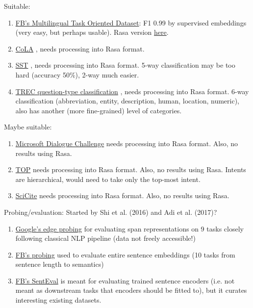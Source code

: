 \documentclass[bsc,frontabs,twoside,singlespacing,parskip,deptreport]{infthesis}
\begin{document}
{{    Suitable:
    \begin{enumerate}
      \item \href{https://fb.me/multilingual_task_oriented_data}{FB's Multilingual Task Oriented Dataset}: F1 0.99 by supervised embeddings (very easy, but perhaps usable). Rasa version \href{https://github.com/nghuyong/rasa-nlu-benchmark}{here}.
      \item \href{https://nyu-mll.github.io/CoLA/}{CoLA} \citep{CoLA-paper}, needs processing into Rasa format.
      \item \href{https://nlp.stanford.edu/sentiment/index.html}{SST} \citep{SST-paper}, needs processing into Rasa format. 5-way classification may be too hard (accuracy \texttildelow{}50\%), 2-way much easier.
      \item \href{https://cogcomp.seas.upenn.edu/Data/QA/QC/}{TREC question-type classification} \citep{TREC-paper}, needs processing into Rasa format. 6-way classification (abbreviation, entity, description, human, location, numeric), also has another (more fine-grained) level of categories.
    \end{enumerate}

    Maybe suitable:
    \begin{enumerate}
      \item \href{https://github.com/xiul-msr/e2e_dialog_challenge}{Microsoft Dialogue Challenge} \citep{MDC-paper} needs processing into Rasa format. Also, no results using Rasa.
      \item \href{http://fb.me/semanticparsingdialog}{TOP} \citep{TOP-paper} needs processing into Rasa format. Also, no results using Rasa. Intents are hierarchical, would need to take only the top-most intent.
      \item \href{https://github.com/allenai/scicite}{SciCite} \citep{SciCite-paper} needs processing into Rasa format. Also, no results using Rasa.
    \end{enumerate}

    Probing/evaluation:
    Started by Shi et al. (2016) and Adi et al. (2017)?
    \begin{enumerate}
      \item \href{https://github.com/nyu-mll/jiant/tree/master/probing/data}{Google's edge probing} \citep{Tenney-et-al-2019-1} for evaluating span representations on 9 tasks closely following classical NLP pipeline (data not freely accessible!)
      \item \href{https://github.com/facebookresearch/SentEval/tree/master/data/probing}{FB's probing} \citep{Conneau-et-al-2018} used to evaluate entire sentence embeddings (10 tasks from sentence length to semantics)
      \item \href{https://github.com/facebookresearch/SentEval}{FB's SentEval} \citep{SentEval-paper} is meant for evaluating trained sentence encoders (i.e. not meant as downstream tasks that encoders should be fitted to), but it curates interesting existing datasets.
    \end{enumerate}
  }

}
\end{document}
